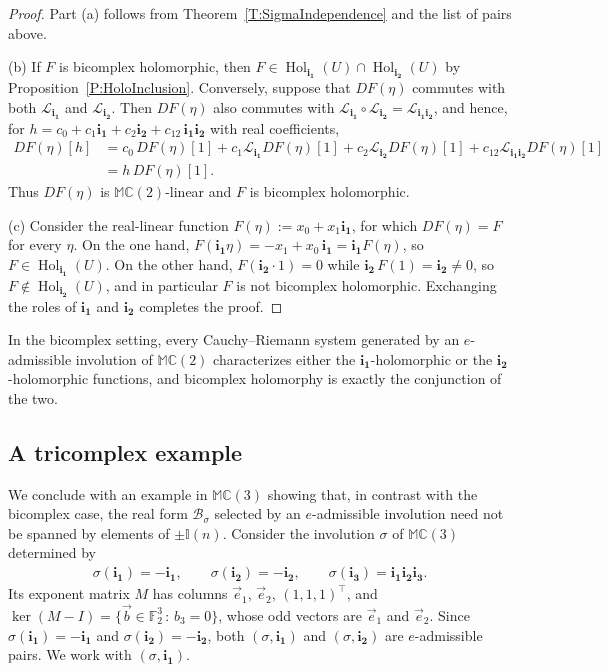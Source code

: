 \documentclass[12pt]{amsart}
\theoremstyle{plain}
\theoremstyle{definition}
\numberwithin{equation}{section}
\newcommand{\im}[1]{\mathbf{ i_{#1}}}
\newcommand{\mC}{\mathbb{C}}
\newcommand{\mM}{\mathbb{M}}
\newcommand{\mI}{\mathbb{I}}
\newcommand{\cL}{\mathcal{L}}
\newcommand{\cB}{\mathcal{B}}
\DeclareMathOperator{\hol}{Hol}
\begin{document}
    \begin{proof}
    Part (a) follows from Theorem~\ref{T:SigmaIndependence} and the list of pairs above.

    (b) If $F$ is bicomplex holomorphic, then $F \in \hol_{\im{1}} (U) \cap \hol_{\im{2}} (U)$ by Proposition~\ref{P:HoloInclusion}. Conversely, suppose that $DF (\eta )$ commutes with both $\cL_{\im{1}}$ and $\cL_{\im{2}}$. Then $DF (\eta )$ also commutes with $\cL_{\im{1}} \circ \cL_{\im{2}} = \cL_{\im{1}\im{2}}$, and hence, for $h = c_0 + c_1 \im{1} + c_2 \im{2} + c_{12}\, \im{1}\im{2}$ with real coefficients,
    \begin{align*}
    DF (\eta ) [h] &= c_0\, DF(\eta)[1] + c_1 \cL_{\im{1}} DF(\eta)[1] + c_2 \cL_{\im{2}} DF(\eta)[1] + c_{12} \cL_{\im{1}\im{2}} DF(\eta)[1] \\
    &= h\, DF(\eta)[1].
    \end{align*}
    Thus $DF (\eta )$ is $\mM \mC(2)$-linear and $F$ is bicomplex holomorphic.

    (c) Consider the real-linear function $F (\eta ) := x_0 + x_1 \im{1}$, for which $DF (\eta ) = F$ for every $\eta$. On the one hand, $F (\im{1} \eta ) = - x_1 + x_0\, \im{1} = \im{1} F (\eta )$, so $F \in \hol_{\im{1}} (U)$. On the other hand, $F (\im{2} \cdot 1 ) = 0$ while $\im{2}\, F (1) = \im{2} \neq 0$, so $F \notin \hol_{\im{2}} (U)$, and in particular $F$ is not bicomplex holomorphic. Exchanging the roles of $\im{1}$ and $\im{2}$ completes the proof.
    \end{proof}

In the bicomplex setting, every Cauchy--Riemann system generated by an $e$-admissible involution of $\mM \mC(2)$ characterizes either the $\im{1}$-holomorphic or the $\im{2}$-holomorphic functions, and bicomplex holomorphy is exactly the conjunction of the two.

\subsection{A tricomplex example}\label{SS:Tricomplex}

We conclude with an example in $\mM \mC(3)$ showing that, in contrast with the bicomplex case, the real form $\cB_\sigma$ selected by an $e$-admissible involution need not be spanned by elements of $\pm \mI(n)$. Consider the involution $\sigma$ of $\mM \mC(3)$ determined by
    \begin{align*}
    \sigma (\im{1}) = - \im{1} , \qquad \sigma (\im{2}) = -\im{2} , \qquad \sigma (\im{3}) = \im{1}\im{2}\im{3} .
    \end{align*}
Its exponent matrix $M$ has columns $\vec e_1$, $\vec e_2$, $(1,1,1)^\top$, and $\ker (M - I) = \{ \vec b \in \mathbb F_2^3\, :\, b_3 = 0 \}$, whose odd vectors are $\vec e_1$ and $\vec e_2$. Since $\sigma (\im{1}) = -\im{1}$ and $\sigma (\im{2}) = - \im{2}$, both $(\sigma , \im{1})$ and $(\sigma , \im{2})$ are $e$-admissible pairs. We work with $(\sigma , \im{1})$.
\end{document}
